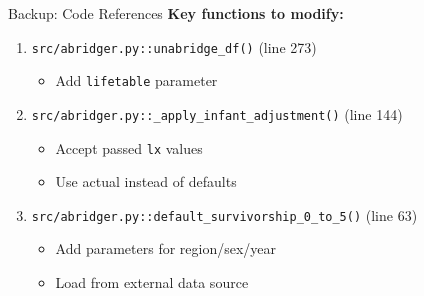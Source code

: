 \documentclass[aspectratio=169]{beamer}
\begin{document}
\begin{frame}{Backup: Code References}
\textbf{Key functions to modify:}

\begin{enumerate}
    \item \texttt{src/abridger.py::unabridge\_df()} (line 273)
    \begin{itemize}
        \item Add \texttt{lifetable} parameter
    \end{itemize}
    
    \item \texttt{src/abridger.py::\_apply\_infant\_adjustment()} (line 144)
    \begin{itemize}
        \item Accept passed \texttt{lx} values
        \item Use actual instead of defaults
    \end{itemize}
    
    \item \texttt{src/abridger.py::default\_survivorship\_0\_to\_5()} (line 63)
    \begin{itemize}
        \item Add parameters for region/sex/year
        \item Load from external data source
    \end{itemize}
\end{enumerate}
\end{frame}
\end{document}
